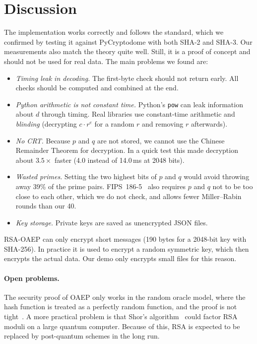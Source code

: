 \documentclass[runningheads]{llncs}
\newcommand{\code}[1]{\texttt{#1}}
\begin{document}
\section{Discussion}\label{sec:discussion}

The implementation works correctly and follows the standard, which we
confirmed by testing it against PyCryptodome with both SHA-2 and SHA-3. Our
measurements also match the theory quite well. Still, it is a proof of
concept and should not be used for real data. The main problems we found are:
\begin{itemize}
  \item \emph{Timing leak in decoding.} The first-byte check should not
    return early. All checks should be computed and combined at the end.
  \item \emph{Python arithmetic is not constant time.} Python's \code{pow}
    can leak information about $d$ through timing. Real libraries use
    constant-time arithmetic and \emph{blinding} (decrypting $c \cdot r^e$
    for a random $r$ and removing $r$ afterwards).
  \item \emph{No CRT.} Because $p$ and $q$ are not stored, we cannot use the
    Chinese Remainder Theorem for decryption. In a quick test this made
    decryption about $3.5\times$ faster (4.0 instead of 14.0\,ms at 2048 bits).
  \item \emph{Wasted primes.} Setting the two highest bits of $p$ and $q$
    would avoid throwing away 39\% of the prime pairs. FIPS~186-5~\cite{fips1865}
    also requires $p$ and $q$ not to be too close to each other, which we do
    not check, and allows fewer Miller--Rabin rounds than our 40.
  \item \emph{Key storage.} Private keys are saved as unencrypted JSON files.
\end{itemize}

RSA-OAEP can only encrypt short messages (190 bytes for a 2048-bit key with
SHA-256). In practice it is used to encrypt a random symmetric key, which
then encrypts the actual data. Our demo only encrypts small files for this
reason.

\paragraph{Open problems.} The security proof of OAEP only works in the
random oracle model, where the hash function is treated as a perfectly
random function, and the proof is not tight~\cite{pointcheval2002}. A more
practical problem is that Shor's algorithm~\cite{shor1997} could factor RSA
moduli on a large quantum computer. Because of this, RSA is expected to be
replaced by post-quantum schemes in the long run.
\end{document}
